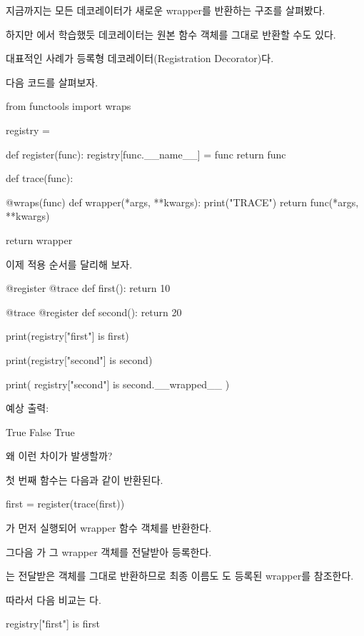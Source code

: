 지금까지는 모든 데코레이터가 새로운 wrapper를 반환하는 구조를 살펴봤다.

하지만 에서 학습했듯 데코레이터는 원본 함수 객체를 그대로 반환할 수도 있다.

대표적인 사례가 등록형 데코레이터(Registration Decorator)다.

다음 코드를 살펴보자.

\begin{dhkcode}
from functools import wraps

registry = {}

def register(func):
    registry[func.__name__] = func
    return func


def trace(func):

    @wraps(func)
    def wrapper(*args, **kwargs):
        print("TRACE")
        return func(*args, **kwargs)

    return wrapper
\end{dhkcode}

이제 적용 순서를 달리해 보자.

\begin{dhkcode}
@register
@trace
def first():
    return 10


@trace
@register
def second():
    return 20


print(registry["first"] is first)

print(registry["second"] is second)

print(
    registry["second"]
    is second.__wrapped__
)
\end{dhkcode}

예상 출력:

\begin{dhkzsh}
True
False
True
\end{dhkzsh}

왜 이런 차이가 발생할까?

첫 번째 함수는 다음과 같이 반환된다.

\begin{dhkcode}
first = register(trace(first))
\end{dhkcode}

가 먼저 실행되어 wrapper 함수 객체를 반환한다.

그다음 가 그 wrapper 객체를 전달받아 등록한다.

는 전달받은 객체를 그대로 반환하므로 최종 이름도 도 등록된 wrapper를 참조한다.

따라서 다음 비교는 다.

\begin{dhkcode}
registry["first"] is first
\end{dhkcode}

